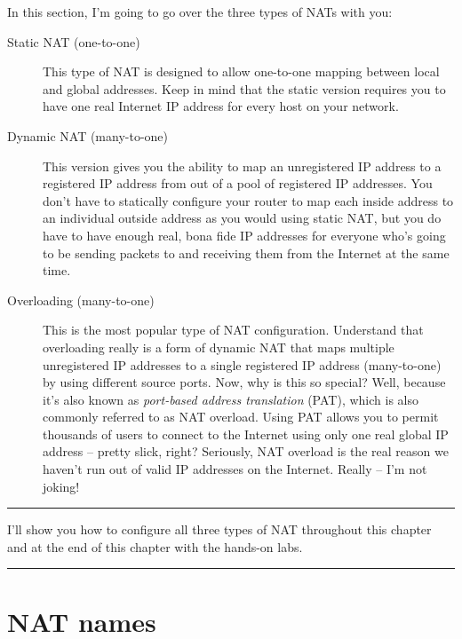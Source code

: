 \documentclass[b5paper,11pt]{memoir}
\begin{document}
In this section, I'm going to go over the three types of NATs with you:
\begin{description}
   \item[Static NAT (one-to-one)]
      This type of NAT is designed to allow one-to-one mapping between local and global addresses.
      Keep in mind that the static version requires you to have one real Internet IP address for every host on your network.

   \item[Dynamic NAT (many-to-one)]
      This version gives you the ability to map an unregistered IP address to a registered IP address from out of a pool of registered IP addresses.
      You don't have to statically configure your router to map each inside address to an individual outside address as you would using static NAT, but you do have to have enough real, bona fide IP addresses for everyone who's going to be sending packets to and receiving them from the Internet at the same time.

   \item[Overloading (many-to-one)]
      This is the most popular type of NAT configuration.
      Understand that overloading really is a form of dynamic NAT that maps multiple unregistered IP addresses to a single registered IP address (many-to-one) by using different source ports.
      Now, why is this so special?
      Well, because it's also known as \emph{port-based address translation} (PAT), which is also commonly referred to as NAT overload.
      Using PAT allows you to permit thousands of users to connect to the Internet using only one real global IP address -- pretty slick, right?
      Seriously, NAT overload is the real reason we haven't run out of valid IP addresses on the Internet.
      Really -- I'm not joking!
\end{description}


\begin{center}\rule{0.5\linewidth}{0.5pt}\end{center}

I'll show you how to configure all three types of NAT throughout this chapter and at the end of this chapter with the hands-on labs.

\begin{center}\rule{0.5\linewidth}{0.5pt}\end{center}



\section{NAT names}
\end{document}
